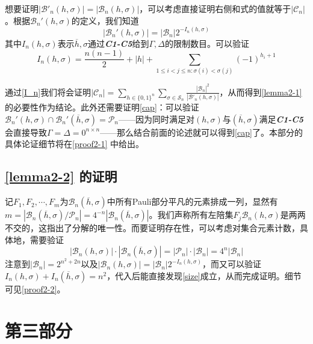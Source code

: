 \documentclass[8pt]{article}
\begin{document}
想要证明$|\mathcal B'_n(h, \sigma)| = |\mathcal B_n(h, \sigma)|$，可以考虑直接证明右侧和式的值就等于$|\mathcal C_n|$。根据$\mathcal B_n'(h, \sigma)$的定义，我们知道\begin{equation}
|\mathcal B_n'(h, \sigma)| = |\mathcal B_n|2^{-I_n(h, \sigma)}
\label{B_n}
\end{equation}
其中$I_n(h, \sigma)$表示$\overline h, \sigma$通过\textbf{\textit{C1-C5}}给到$\Gamma, \Delta$的限制数目。可以验证\begin{equation}
I_n(h, \sigma) = \frac{n(n-1)}{2} + |h| + \sum_{1 \le i < j \le n: \sigma(i) < \sigma(j)}(-1)^{h_i + 1}
\label{I_n}
\end{equation}

通过\cref{I_n}我们将会证明$|\mathcal C_n| = \sum_{h \in \{0, 1\}^n} \sum_{\sigma \in \mathcal S_n} \frac{|\mathcal B_n|^2}{|\mathcal B'_n(h, \sigma)|}$，从而得到\cref{lemma2-1} 的必要性作为结论。此外还需要证明\cref{cap}：可以验证$\mathcal B_n'(h, \sigma) \cap \mathcal B_n'(\overline h, \sigma) = \mathcal P_n$——因为同时满足对$(h, \sigma)$与$(\overline h, \sigma)$满足\textbf{\textit{C1-C5}}会直接导致$\Gamma = \Delta = 0^{n\times n}$——那么结合前面的论述就可以得到\cref{cap}了。本部分的具体论证细节将在\cref{proof2-1} 中给出。

\subsection{\cref{lemma2-2} 的证明}

记$F_1, F_2, \cdots, F_m$为$\mathcal B_n(\overline h, \sigma)$中所有Pauli部分平凡的元素排成一列，显然有$m = |\mathcal B_n(\overline h, \sigma) / \mathcal P_n| = 4^{-n}|\mathcal B_n(\overline h, \sigma)|$。我们声称所有左陪集$F_j\mathcal B_n(h, \sigma)$是两两不交的，这指出了分解的唯一性。而要证明存在性，可以考虑对集合元素计数，具体地，需要验证\begin{equation}
|\mathcal B_n(h, \sigma)| \cdot |\mathcal B_n(\overline h, \sigma)| = |\mathcal P_n| \cdot |\mathcal B_n| = 4^n |\mathcal B_n|
\label{size}
\end{equation}
注意到$|\mathcal B_n| = 2^{n^2 + 2n}$以及$|\mathcal B_n(h, \sigma)| = |\mathcal B_n|2^{-I_n(h, \sigma)}$，而又可以验证$I_n(h, \sigma) + I_n(\overline h, \sigma) = n^2$，代入后能直接发现\cref{size}成立，从而完成证明。细节可见\cref{proof2-2}。

\section{第三部分}\label{partC}
\end{document}
